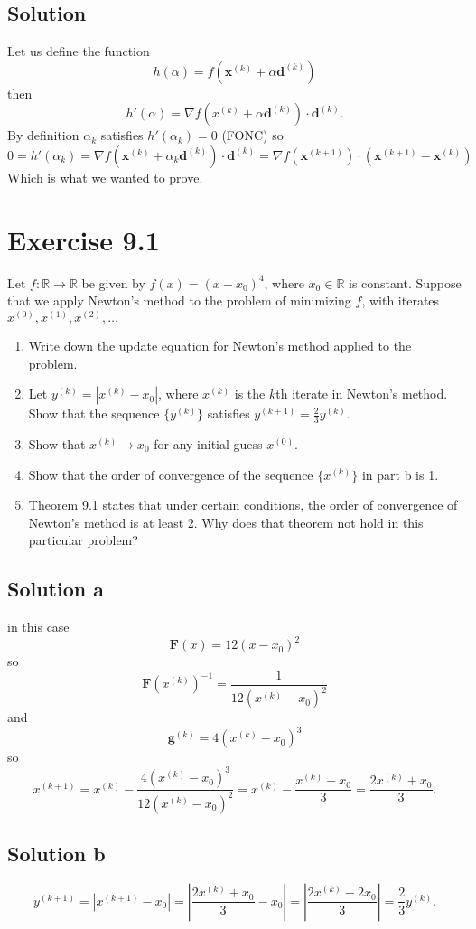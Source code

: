 \documentclass{article}
\newcommand{\bld}[1]{\boldsymbol{#1}}
\begin{document}
\subsection*{Solution}
Let us define the function
\[
	h(\alpha)=f(\bld{x}^{(k)}+\alpha\bld{d}^{(k)})
\]
then
\[
	h'(\alpha)=\nabla f(x^{(k)}+\alpha \bld{d}^{(k)}) \cdot \bld{d}^{(k)}.
\]
By definition $\alpha_k$ satisfies $h'(\alpha_k)=0$ (FONC) so
\[
	0=h'(\alpha_k)=\nabla f(\bld{x}^{(k)}+\alpha_k \bld{d}^{(k)}) \cdot
	\bld{d}^{(k)} = \nabla f(\bld{x}^{(k+1)}) \cdot
	(\bld{x}^{(k+1)}-\bld{x}^{(k)})
\]
Which is what we wanted to prove.
\section*{Exercise 9.1}
Let $f:\mathbb{R} \to \mathbb{R}$ be given by $f(x) = (x-x_0)^4$, where $x_0\in \mathbb{R}$ is constant. Suppose that we apply Newton's method to the problem of minimizing $f$, with iterates $x^{(0)},x^{(1)},x^{(2)},\dots$
\begin{enumerate}[label=\alph*.]
\item Write down the update equation for Newton's method applied to the
problem.
\item Let $y^{(k)}=|x^{(k)}-x_0|$, where $x^{(k)}$ is the $k$th iterate in
	Newton's method. Show that the sequence $\{y^{(k)}\}$ satisfies
	$y^{(k+1)}=\frac{2}{3}y^{(k)}$.
\item Show that $x^{(k)}\to x_0$ for any initial guess $x^{(0)}$.
\item Show that the order of convergence of the sequence $\{x^{(k)}\}$ in part
	b is 1.
\item Theorem 9.1 states that under certain conditions, the order of
	convergence of Newton's method is at least 2. Why does that theorem not
	hold in this particular problem?
\end{enumerate}
\subsection*{Solution a}
in this case
\[
	\bld{F}(x)=12(x-x_0)^2
\]
so
\[
	\bld{F}(x^{(k)})^{-1}=\frac{1}{12(x^{(k)}-x_0)^2}
\]
and
\[
	\bld{g}^{(k)}=4(x^{(k)}-x_0)^3
\]
so
\[
	x^{(k+1)}=x^{(k)}-\frac{4(x^{(k)}-x_0)^3}{12(x^{(k)}-x_0)^2}=
	x^{(k)}-\frac{x^{(k)}-x_0}{3} = \frac{2x^{(k)}+x_0}{3}.
\]
\subsection*{Solution b}
\[
	y^{(k+1)}=|x^{(k+1)}-x_0|=\left|\frac{2x^{(k)}+x_0}{3}-x_0\right|
	=\left|\frac{2x^{(k)}-2x_0}{3}\right|=\frac{2}{3}y^{(k)}.
\]
\end{document}
